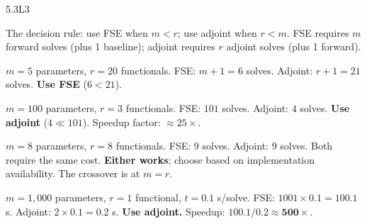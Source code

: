 \begin{solution}{5.3}{L3}

\solanswer

The decision rule: use FSE when $m < r$; use adjoint when $r < m$.
FSE requires $m$ forward solves (plus 1 baseline); adjoint requires $r$
adjoint solves (plus 1 forward).

 $m = 5$ parameters, $r = 20$ functionals.
FSE: $m + 1 = 6$ solves. Adjoint: $r + 1 = 21$ solves.
\textbf{Use FSE} ($6 < 21$).

 $m = 100$ parameters, $r = 3$ functionals.
FSE: $101$ solves. Adjoint: $4$ solves.
\textbf{Use adjoint} ($4 \ll 101$). Speedup factor: $\approx 25\times$.

 $m = 8$ parameters, $r = 8$ functionals.
FSE: 9 solves. Adjoint: 9 solves. Both require the same cost.
\textbf{Either works}; choose based on implementation availability.
The crossover is at $m = r$.

 $m = 1{,}000$ parameters, $r = 1$ functional, $t = 0.1$ s/solve.
FSE: $1001 \times 0.1 = 100.1$ s. Adjoint: $2 \times 0.1 = 0.2$ s.
\textbf{Use adjoint.} Speedup: $100.1/0.2 \approx \mathbf{500\times}$.


\end{solution}

